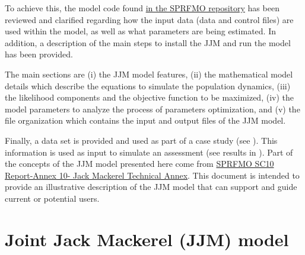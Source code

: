 \documentclass{article}
\begin{document}

To achieve this, the model code found \href{https://github.com/SPRFMO/jjm/blob/main/src/jjm.tpl}{in the SPRFMO repository} has been reviewed and clarified regarding how the input data (data and control files) are used within the model, as well as what parameters are being estimated. In addition, a description of the main steps to install the JJM and run the model has been provided.

The main sections are (i) the JJM model features, (ii) the mathematical model details which describe the equations to simulate the population dynamics, (iii) the likelihood components and the objective function to be maximized, (iv) the model parameters to analyze the process of parameters optimization, and (v) the file organization which contains the input and output files of the JJM model.

Finally, a data set is provided and used as part of a case study (see ). This information is used as input to simulate an assessment (see results in ).
Part of the concepts of the JJM model presented here come from \href{https://www.sprfmo.int/assets/Meetings/SC/10th-SC-2022/Report-and-Annexes/Annex-8-JM-Technical-Advice-CV_2.pdf}{SPRFMO SC10 Report-Annex 10- Jack Mackerel Technical Annex}. This document is intended to provide an illustrative description of the JJM model that can support and guide current or potential users.

\section{Joint Jack Mackerel (JJM) model}
\end{document}

